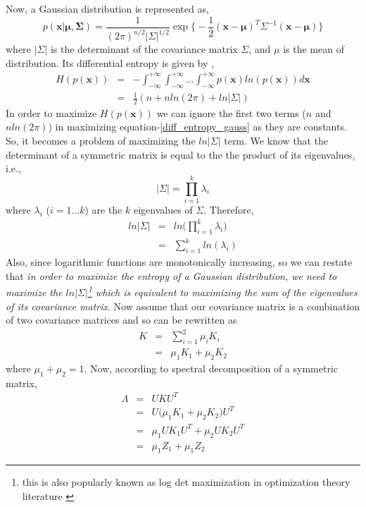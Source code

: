 Now, a Gaussian distribution is represented as,
\begin{equation}
p(\mathbf{x|\mu,\Sigma})=\frac{1}{(2\pi)^{n/2}\lvert\Sigma\rvert^{1/2}}\exp \big\lbrace -\frac{1}{2}(\mathbf{x-\mu})^{T}\Sigma^{-1} (\mathbf{x-\mu}) \big \rbrace
\end{equation}
where $\lvert\Sigma\rvert$ is the determinant of the covariance matrix $\Sigma$, and $\mu$ is the mean of distribution. Its differential entropy is given by \citep{brookes2005matrix},
\begin{eqnarray}
H(p(\mathbf{x})) &=& -\int_{-\infty}^{+\infty} \int_{-\infty}^{+\infty} \dots \int_{-\infty}^{+\infty}p(\mathbf{x})ln (p(\mathbf{x})) d\mathbf{x} \\
&=& \frac{1}{2}(n+n ln(2\pi)+ln|\Sigma|) \label{diff_entropy_gauss}
\end{eqnarray}
In order to maximize $H(p(\mathbf{x}))$ we can ignore the first two terms ($n$ and $n ln(2\pi)$) in maximizing equation-\ref{diff_entropy_gauss} as they are constants. So, it becomes a problem of maximizing the $ln|\Sigma|$ term. 
We know that the determinant of a symmetric matrix is equal to the the product of its eigenvalues, i.e.,
\[
|\Sigma|=\prod_{i=1}^{k}\lambda_{i}
\]
where $\lambda_{i}$ ($i=1\dots k$) are the $k$ eigenvalues of $\Sigma$. Therefore,
\begin{eqnarray}
ln|\Sigma|&=& ln\big (\prod_{i=1}^{k}\lambda_{i} \big) \\
&=& \sum_{i=1}^{k} ln (\lambda_{i}) \label{max_det}
\end{eqnarray}
Also, since logarithmic functions are monotonically increasing, so we can restate that \textit{in order to maximize the entropy of a Gaussian distribution, we need to maximize the $ln|\Sigma|$\footnote{this is also popularly known as log det maximization in optimization theory literature \citep{boyd2004convexopt}} which is equivalent to maximizing the sum of the eigenvalues of its covariance matrix}. Now assume that our covariance matrix is a combination of two covariance matrices and so can be rewritten as
\begin{eqnarray}
K &=& \sum_{i=1}^{2}\mu_{i}K_{i} \\
&=& \mu_{1}K_{1}+\mu_{2}K_{2}
\end{eqnarray}
where $\mu_{1}+\mu_{2}=1$. Now, according to spectral decomposition of a symmetric matrix,
\begin{eqnarray}
\Lambda &=& UKU^{T} \\ 
&=& U\big (\mu_{1}K_{1}+\mu_{2}K_{2} \big )U^{T} \\
&=& \mu_{1}UK_{1}U^{T}+\mu_{2}UK_{2}U^{T}  \\
&=& \mu_{1}Z_{1}+ \mu_{1}Z_{2} \label{eigv_split_1} 
\end{eqnarray}
